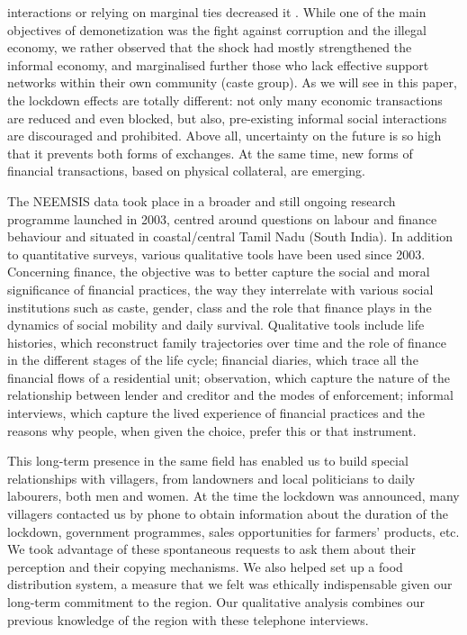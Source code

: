 \documentclass[a4paper, 11pt, onecolumn]{article}
\begin{document}
interactions or relying on marginal ties decreased it \citep{Hilger2020}. While one of the main objectives of demonetization was the fight against corruption and the illegal economy, we rather observed that the shock had mostly strengthened the informal economy, and marginalised further those who lack effective support networks within their own community (caste group). As we will see in this paper, the lockdown effects are totally different: not only many economic transactions are reduced and even blocked, but also, pre-existing informal social interactions are discouraged and prohibited. Above all, uncertainty on the future is so high that it prevents both forms of exchanges. At the same time, new forms of financial transactions, based on physical collateral, are emerging.

The NEEMSIS data took place in a broader and still ongoing research programme launched in 2003, centred around questions on labour and finance behaviour and situated in coastal/central Tamil Nadu (South India). In addition to quantitative surveys, various qualitative tools have been used since 2003. Concerning finance, the objective was to better capture the social and moral significance of financial practices, the way they interrelate with various social institutions such as caste, gender, class and the role that finance plays in the dynamics of social mobility and daily survival. Qualitative tools include life histories, which reconstruct family trajectories over time and the role of finance in the different stages of the life cycle; financial diaries, which trace all the financial flows of a residential unit; observation, which capture the nature of the relationship between lender and creditor and the modes of enforcement; informal interviews, which capture the lived experience of financial practices and the reasons why people, when given the choice, prefer this or that instrument. 

This long-term presence in the same field has enabled us to build special relationships with villagers, from landowners and local politicians to daily labourers, both men and women. At the time the lockdown was announced, many villagers contacted us by phone to obtain information about the duration of the lockdown, government programmes, sales opportunities for farmers' products, etc. We took advantage of these spontaneous requests to ask them about their perception and their copying mechanisms. We also helped set up a food distribution system, a measure that we felt was ethically indispensable given our long-term commitment to the region. Our qualitative analysis combines our previous knowledge of the region with these telephone interviews. 
\end{document}
